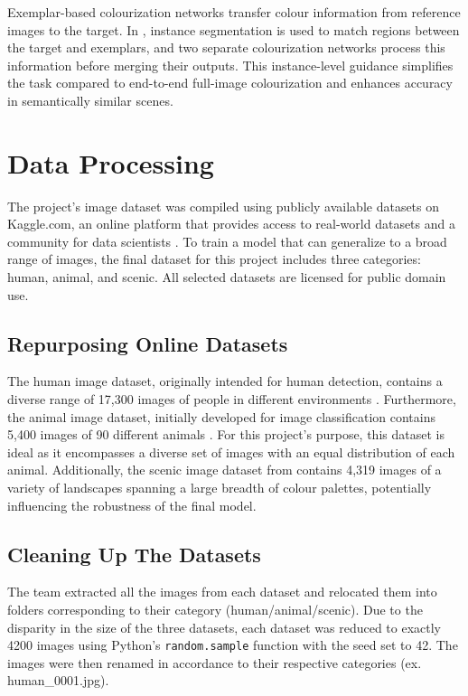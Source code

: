 \documentclass{article} %
\begin{document}
Exemplar-based colourization networks transfer colour information from reference images to the target. In \citet{su2020instanceawareimagecolorization}, instance segmentation is used 
to match regions between the target and exemplars, and two separate colourization networks process this information before merging their outputs. This instance-level guidance simplifies 
the task compared to end-to-end full-image colourization and enhances accuracy in semantically similar scenes.

\section{Data Processing}

 The project's image dataset was compiled using publicly available datasets on Kaggle.com, an online platform that provides access to real-world datasets and a community for data 
 scientists \citep[]{kaggle}. To train a model that can generalize to a broad range of images, the final dataset for this project includes three categories: human, animal, and scenic. 
 All selected datasets are licensed for public domain use. 

\subsection{Repurposing Online Datasets}

The human image dataset, originally intended for human detection, contains a diverse range of 17,300 images of people in different environments \citep[]{kaggle_human}. Furthermore, 
the animal image dataset, initially developed for image classification contains 5,400 images of 90 different animals \citep[]{kaggle_animal}. For this project's purpose, this dataset 
is ideal as it encompasses a diverse set of images with an equal distribution of each animal. Additionally, the scenic image dataset from \citet{kaggle_scene} contains 4,319 images of 
a variety of landscapes spanning a large breadth of colour palettes, potentially influencing the robustness of the final model.

\subsection{Cleaning Up The Datasets}
The team extracted all the images from each dataset and relocated them into folders corresponding to their category (human/animal/scenic). Due to the disparity in the size of the 
three datasets, each dataset was reduced to exactly 4200 images using Python's \verb|random.sample| function with the seed set to 42. The images were then renamed in accordance to 
their respective categories (ex. human\_0001.jpg). 
\end{document}
